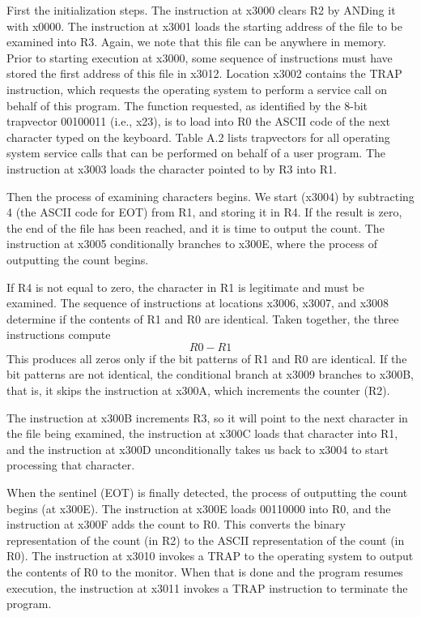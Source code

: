 \documentclass{patt}
\begin{document}
First the initialization steps.  The instruction at x3000 clears R2 by
ANDing it with x0000. The instruction at x3001 loads the starting address
of the file to be examined into R3.  Again, we note that this file can be 
anywhere in memory.  Prior to starting execution at x3000, some sequence 
of instructions must have stored the
first address of this file in x3012.  Location x3002 contains the TRAP
instruction, which requests the operating system to perform a service
call on behalf of this program.  The function requested, as identified
by the 8-bit trapvector 00100011 (i.e., x23), is to load into R0 the
ASCII code of the next character typed on the keyboard.  Table A.2 lists 
trapvectors for all operating system service calls that can be performed
on behalf of a user program.  The instruction at x3003 loads
the character pointed to by R3 into R1.

Then the process of examining characters begins.  We start (x3004) by
subtracting 4 (the ASCII code for EOT) from R1, and storing it in R4.
If the result is zero, the end of the file has been reached, and it is
time to output the count.  The instruction at x3005 conditionally
branches to x300E, where the process of outputting the count begins.

If R4 is not equal to zero, the character in R1 is legitimate and must
be examined. The sequence of instructions at locations x3006, x3007,
and x3008 determine if the contents of R1 and R0 are identical.  Taken
together, the three instructions compute 
\begin{equation*}
R0 - R1
\end{equation*}
This produces all zeros only if the bit patterns of R1 and R0 are
identical.  If the bit patterns are not identical, the conditional
branch at x3009 branches to x300B, that is, it skips the instruction
at x300A, which increments the counter (R2).

The instruction at x300B increments R3, so it will point to the next
character in the file being examined, the instruction at x300C loads
that character into R1, and the instruction at x300D unconditionally
takes us back to x3004 to start processing that character.

When the sentinel (EOT) is finally detected, the process of outputting
the count begins (at x300E).  The instruction at x300E loads 00110000
into R0, and the instruction at x300F adds the count to R0.  This
converts the binary representation of the count (in R2) to the ASCII
representation of the count (in R0).  The instruction at x3010 invokes
a TRAP to the operating system to output the contents of R0 to the
monitor.  When that is done and the program resumes execution, the
instruction at x3011 invokes a TRAP instruction to terminate the
program.
\end{document}
